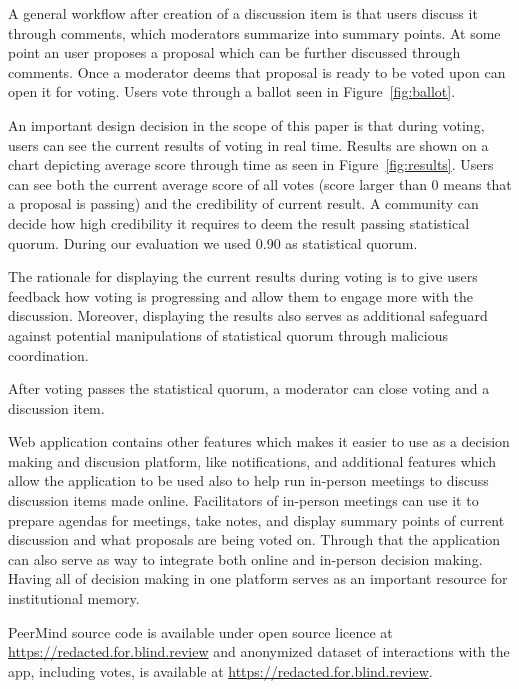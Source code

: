 \documentclass[format=acmsmall, review=true, screen=true, anonymous=true]{acmart}
\begin{document}
A general workflow after creation of a discussion item is that users discuss it through comments,
which moderators summarize into summary points. At some point an user proposes a proposal which can be
further discussed through comments. Once a moderator deems that proposal is ready to be voted upon
can open it for voting. Users vote through a ballot seen in Figure~\ref{fig:ballot}.

An important design decision in the scope of this paper is that during voting, users can see the current
results of voting in real time. Results are shown on a chart depicting average score through time
as seen in Figure~\ref{fig:results}. Users can see both the current average score of all votes (score
larger than 0 means that a proposal is passing) and the credibility of current result. A community can decide
how high credibility it requires to deem the result passing statistical quorum. During our evaluation
we used 0.90 as statistical quorum.

The rationale for displaying the current results during voting is to give users feedback how voting
is progressing and allow them to engage more with the discussion. Moreover, displaying the results
also serves as additional safeguard against potential manipulations of statistical quorum through malicious
coordination.

After voting passes the statistical quorum, a moderator can close voting and a discussion item.

Web application contains other features which makes it easier to use as a decision making and discusion
platform, like notifications, and additional features which allow the application to be used also to
help run in-person meetings to discuss discussion items made
online. Facilitators of in-person meetings can use it to prepare agendas for meetings, take notes,
and display summary points of current discussion and what proposals are being voted on. Through that the
application can also serve as way to integrate both online and in-person decision making. Having all of
decision making in one platform serves as an important resource for institutional memory.

PeerMind source code is available under open source licence at \url{https://redacted.for.blind.review} and
anonymized dataset of interactions with the app, including votes, is available at \url{https://redacted.for.blind.review}.
\end{document}
